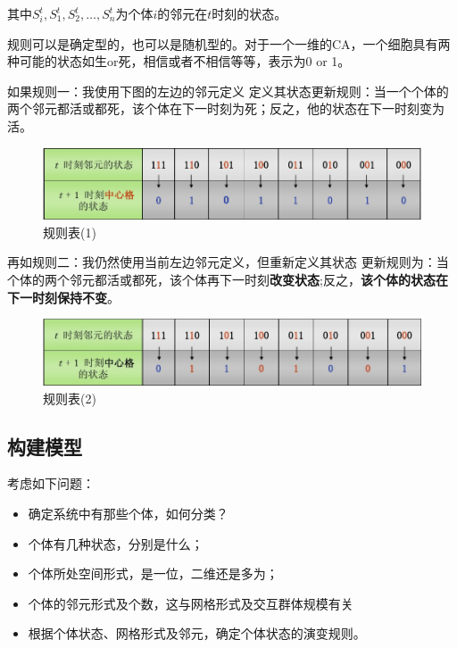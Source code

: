 \documentclass[UTF8]{ctexart}
\begin{document}
    其中$S_i^t,S_1^t,S_2^t,\dots,S_n^t$为个体$i$的邻元在$t$时刻的状态。


    规则可以是确定型的，也可以是随机型的。对于一个一维的CA，一个细胞具有两种可能的状态如生or死，相信或者不相信等等，表示为0 or 1。


    如果规则一：我使用下图的左边的邻元定义
    定义其状态更新规则：当一个个体的两个邻元都活或都死，该个体在下一时刻为死；反之，他的状态在下一时刻变为活。

    \begin{figure}[h]
        \centering
        \includegraphics[width=12cm]{img/rule_table.png}
        \caption{规则表(1)}
    \end{figure}

    再如规则二：我仍然使用当前左边邻元定义，但重新定义其状态
    更新规则为：当个体的两个邻元都活或都死，该个体再下一时刻\textbf{改变状态};反之，\textbf{该个体的状态在下一时刻保持不变}。

    \begin{figure}[htb]
        \centering
        \includegraphics[width=12cm]{img/rule_table(1).png}
        \caption{规则表(2)}
        
    \end{figure}

    \subsection{构建模型}

    考虑如下问题：
    \begin{itemize}
        \item 确定系统中有那些个体，如何分类？
        \item 个体有几种状态，分别是什么；
        \item 个体所处空间形式，是一位，二维还是多为；
        \item 个体的邻元形式及个数，这与网格形式及交互群体规模有关
        \item 根据个体状态、网格形式及邻元，确定个体状态的演变规则。        
    \end{itemize}
\end{document}
